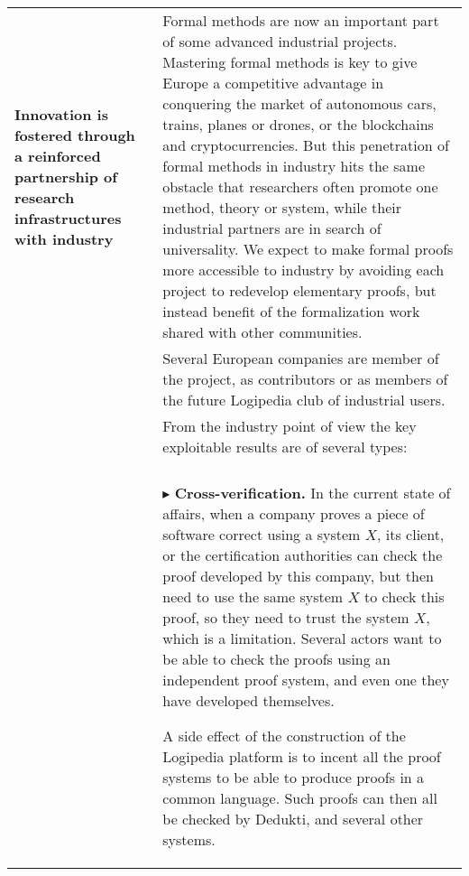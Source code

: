 \begin{longtable}{|p{}|p{}|}
\hline
{\bf Innovation is fostered through a reinforced partnership of
research infrastructures with industry}
&
Formal methods are now an important part of some advanced industrial
projects. Mastering formal methods is key to give Europe a competitive
advantage in conquering the market of autonomous cars, trains, planes
or drones, or the blockchains and cryptocurrencies. But this
penetration of formal methods in industry hits the same obstacle that
researchers often promote one method, theory or system, while their
industrial partners are in search of universality. We expect to make
formal proofs more accessible to industry by avoiding each project to
redevelop elementary proofs, but instead benefit of the formalization
work shared with other communities.\\
&
\hspace{0.4cm}
Several European companies are member of the project,
as contributors or as members of the future Logipedia
club of industrial users.\\
&
\hspace{0.4cm}
From the industry point of view the key exploitable results are of several
types:\\
&\\
&
$\blacktriangleright$ 
{\bf Cross-verification.}
In the current state of affairs, when a company proves a piece of
software correct using a system $X$, its client, or the certification
authorities can check the proof developed by this company, but then
need to use the same system $X$ to check this proof, so they need to
trust the system $X$, which is a limitation. Several actors want to be
able to check the proofs using an independent proof system, and even
one they have developed themselves.

A side effect of the construction of the Logipedia platform is
to incent all the proof systems to be able to produce proofs in a
common language. Such proofs can then all be checked by
Dedukti, and several other systems.


\end{longtable}
